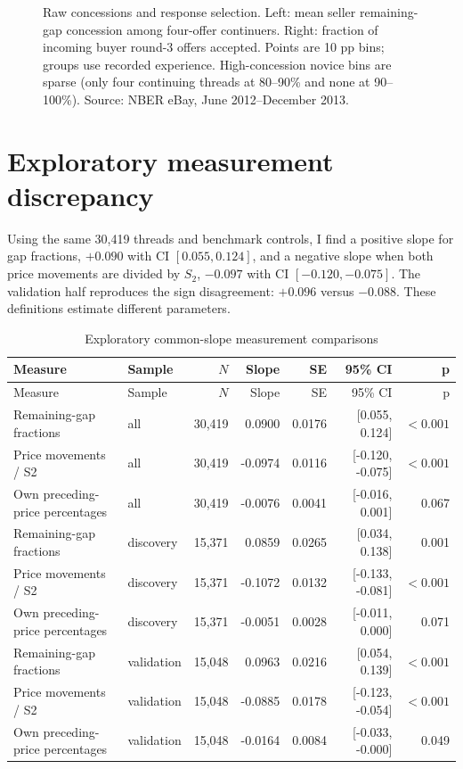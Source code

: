 \documentclass[11pt,a4paper]{article}
\begin{document}
\begin{figure}[htbp]
\caption{Raw concessions and response selection. Left: mean seller remaining-gap
concession among four-offer continuers. Right: fraction of incoming buyer
round-3 offers accepted. Points are 10 pp bins; groups use recorded experience.
High-concession novice bins are sparse (only four continuing threads at
80--90\% and none at 90--100\%). Source: NBER eBay, June 2012--December 2013.}
\label{fig:selection}\end{figure}

\section{Exploratory measurement discrepancy}
Using the same 30,419 threads and benchmark controls, I find a positive slope for gap
fractions, $+0.090$ with CI $[0.055,0.124]$, and a negative slope when both
price movements are divided by $S_2$, $-0.097$ with CI $[-0.120,-0.075]$.
The validation half reproduces the sign disagreement: $+0.096$ versus $-0.088$.
These definitions estimate different parameters.
\small
\begin{longtable}{p{4.3cm}lrrrrr}
\caption{Exploratory common-slope measurement comparisons}\label{tab:measure}\\
\toprule
Measure & Sample & $N$ & Slope & SE & 95\% CI & p \\
\midrule\endfirsthead
\toprule
Measure & Sample & $N$ & Slope & SE & 95\% CI & p \\
\midrule\endhead
\bottomrule\endfoot
Remaining-gap fractions & all & 30,419 & 0.0900 & 0.0176 & [0.055, 0.124] & $<0.001$ \\
Price movements / S2 & all & 30,419 & -0.0974 & 0.0116 & [-0.120, -0.075] & $<0.001$ \\
Own preceding-price percentages & all & 30,419 & -0.0076 & 0.0041 & [-0.016, 0.001] & 0.067 \\
Remaining-gap fractions & discovery & 15,371 & 0.0859 & 0.0265 & [0.034, 0.138] & 0.001 \\
Price movements / S2 & discovery & 15,371 & -0.1072 & 0.0132 & [-0.133, -0.081] & $<0.001$ \\
Own preceding-price percentages & discovery & 15,371 & -0.0051 & 0.0028 & [-0.011, 0.000] & 0.071 \\
Remaining-gap fractions & validation & 15,048 & 0.0963 & 0.0216 & [0.054, 0.139] & $<0.001$ \\
Price movements / S2 & validation & 15,048 & -0.0885 & 0.0178 & [-0.123, -0.054] & $<0.001$ \\
Own preceding-price percentages & validation & 15,048 & -0.0164 & 0.0084 & [-0.033, -0.000] & 0.049 \\
\end{longtable}
\normalsize
\end{document}
